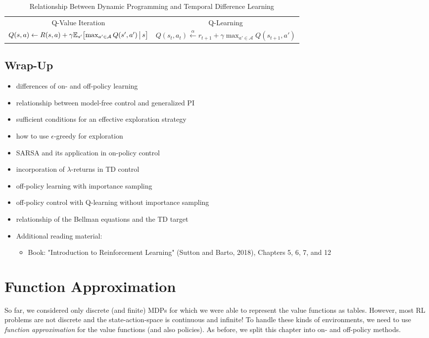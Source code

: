 \begin{table}
\begin{tabular}{c|c}
				Q-Value Iteration                                                                                         & Q-Learning                                                                                              \\
				\( Q(s, a) \gets R(s, a) + \gamma \mathbb{E}_{s'}\bigl[ \max_{a' \in \mathcal{A}} Q(s', a') \,\big\vert\, s \bigr] \) & \( Q(s_t, a_t) \overset{\alpha}{\gets} r_{t + 1} + \gamma \max_{a' \in \mathcal{A}} Q(s_{t + 1}, a') \) \\ \bottomrule
			\end{tabular}
			\caption{Relationship Between Dynamic Programming and Temporal Difference Learning}
			\label{fig:dpTdRelationship}
		\end{table}

	\section{Wrap-Up}
		\begin{itemize}
			\item differences of on- and off-policy learning
			\item relationship between model-free control and generalized \ac{PI}
			\item sufficient conditions for an effective exploration strategy
			\item how to use \(\epsilon\)-greedy for exploration
			\item \ac{SARSA} and its application in on-policy control
			\item incorporation of \(\lambda\)-returns in \ac{TD} control
			\item off-policy learning with importance sampling
			\item off-policy control with Q-learning without importance sampling
			\item relationship of the Bellman equations and the \ac{TD} target
			\item Additional reading material:
				\begin{itemize}
					\item Book: "Introduction to Reinforcement Learning" (Sutton and Barto, 2018), Chapters 5, 6, 7, and 12  %
				\end{itemize}
		\end{itemize}

\chapter{Function Approximation}
	So far, we considered only discrete (and finite) \acp{MDP} for which we were able to represent the value functions as tables. However, most \ac{RL} problems are not discrete and the state-action-space is continuous and infinite! To handle these kinds of environments, we need to use \emph{function approximation} for the value functions (and also policies). As before, we split this chapter into on- and off-policy methods.

